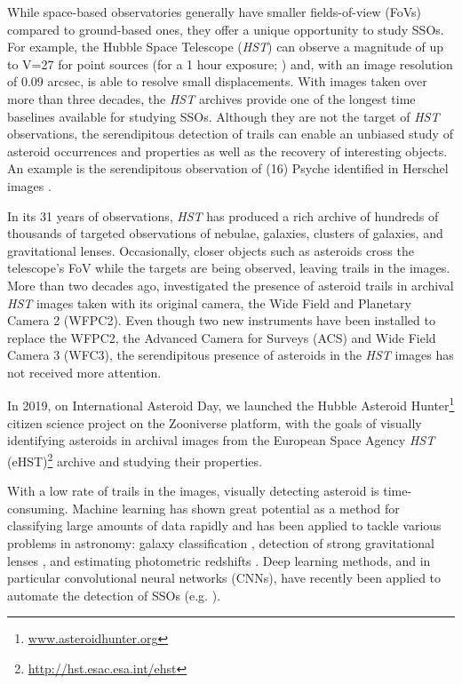 \documentclass{aa}
\begin{document}
While space-based observatories generally have smaller fields-of-view (FoVs) compared to ground-based ones, they offer a unique opportunity to study SSOs. For example, the Hubble Space Telescope (\textit{HST}) can observe a magnitude of up to V=27 for point sources (for a 1 hour exposure; \citealt{Ryon2021}) and, with an image resolution of 0.09 arcsec, is able to resolve small displacements. With images taken over more than three decades,  the \textit{HST} archives provide one of the longest time baselines available for studying SSOs. Although they are not the target of \textit{HST} observations, the serendipitous detection of trails can enable an unbiased study of asteroid occurrences and properties as well as the recovery of interesting objects. An example is the serendipitous observation of (16) Psyche identified in Herschel images \citep{Racero2022}.

In its 31 years of observations, \textit{HST} has produced a rich archive of hundreds of thousands of targeted observations of nebulae, galaxies,  clusters of galaxies, and gravitational lenses. Occasionally, closer objects such as asteroids cross the telescope's FoV while the targets are being observed, leaving trails in the images. More than two decades ago, \citet{Evans1998} investigated the presence of asteroid trails in archival \textit{HST} images taken with its original camera, the Wide Field and Planetary Camera 2 (WFPC2). Even though two new instruments have been installed to replace the WFPC2, the Advanced Camera for Surveys (ACS) and Wide Field Camera 3 (WFC3), the serendipitous presence of asteroids in the \textit{HST} images has not received more attention.

In 2019, on International Asteroid Day, we launched the Hubble Asteroid Hunter\footnote{\url{www.asteroidhunter.org}} citizen science project on the Zooniverse platform, with the goals of visually identifying asteroids in archival images from the European Space Agency \textit{HST}  (eHST)\footnote{\url{http://hst.esac.esa.int/ehst}} archive and studying their properties. 

With a low rate of trails in the images, visually detecting asteroid is time-consuming. Machine learning has shown great potential as a method for classifying large amounts of data rapidly and has been applied to tackle various problems in astronomy: galaxy classification \citep{Dieleman2015,Huertas-Company2015,Walmsley2020,Walmsley2022}, detection of strong gravitational lenses \citep{Canameras2021}, and estimating photometric redshifts \citep{Pasquet2019}. Deep learning methods, and in particular convolutional neural networks (CNNs), have recently been applied to automate the detection of SSOs (e.g. \citealt{Lieu2019,Duev2019}). 
\end{document}
